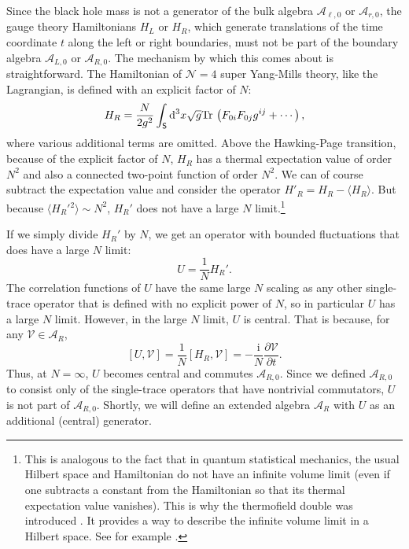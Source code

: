 \documentclass[11pt,a4paper]{article}
\def\i{{\mathrm i}}
\def\be{\begin{equation}}
\def\ee{\end{equation}}
\def\V{{\mathcal V}}
\def\A{{\mathcal A}}
\def\d{{\mathrm d}}
\def\U{{ U}}
\def\S{{\sf S}}
\def\N{{\mathcal N}}
\def\V{{\mathcal V}}
\def\la{\langle}
\def\ra{\rangle}
\def\Tr{\mathrm{Tr}}
\begin{document}
Since the black hole mass is not a generator of the bulk algebra $\A_{\ell,0}$ or $\A_{r,0}$, the gauge theory Hamiltonians $H_L$ or $H_R$, which generate
translations of the time coordinate $t$ along the left or right boundaries, must not be part of the boundary algebra
$\A_{L,0}$ or $\A_{R,0}$.   The mechanism by which this comes about is straightforward.  The Hamiltonian of $\N=4$ super Yang-Mills theory, like the Lagrangian,
is defined with an explicit factor of $N$:
\be\label{toldo} H_R=\frac{N}{2 g^2} \int_\S \d^3x \sqrt g \Tr\, \left( F_{0i} F_{0j} g^{ij}+\cdots \right), \ee
where various additional terms are omitted.  Above the Hawking-Page transition, because of the explicit factor of $N$,  $H_R$ has a thermal expectation value 
of order $N^2$ and also a connected two-point function of order $N^2$.   We can of course subtract the expectation value and consider the operator
$H'_R=H_R-\la H_R\ra$.   But because $\la H_R'{}^2\ra\sim N^2$, $H_R'$ does not have a large $N$ limit.\footnote{This is analogous
to the fact that in quantum statistical mechanics, the usual Hilbert space and Hamiltonian do not have an infinite volume limit (even if one subtracts a
constant from the Hamiltonian so that its thermal expectation value vanishes). This is why the thermofield double
was introduced \cite{HHW}.  It provides a way to describe the infinite volume limit in a Hilbert space.   See for example  \cite{Lecture}.}

If  we simply divide $H_R'$ by $N$, we get an operator with bounded fluctuations that
does have a large $N$ limit: 
\be\label{fugo} \U=\frac{1}{N}H_R'. \ee
The correlation functions of $\U$ have the same large $N$ scaling as any other single-trace operator that is defined with no explicit power of $N$,
so in particular $\U$ has a large $N$ limit.   However, in the large $N$ limit, $\U$ is central.   That is because, for any $\V\in \A_R$,
\be\label{nugo} [\U,\V]=\frac{1}{N}[H_R,\V]=-\frac{\i}{N}\frac{\partial \V}{\partial t}. \ee
Thus, at $N=\infty$, $\U$ becomes central and commutes $\A_{R,0}$.  Since we defined $\A_{R,0}$ to consist only of the single-trace operators that have nontrivial
commutators,   $\U$ is not part of $\A_{R,0}$.   Shortly, we will   define an extended algebra $\A_R$ with $\U$ as an additional (central) generator.
\end{document}
